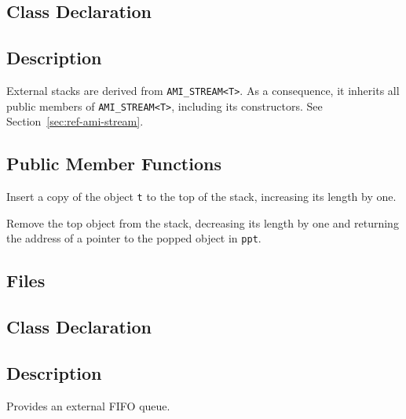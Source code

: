 \subsection{Class Declaration}
   \btabb
         {}
   \etabb

\subsection{Description}
External stacks are derived from  \lstinline|AMI_STREAM<T>|.
 As a
consequence, it inherits all public members of
\lstinline|AMI_STREAM<T>|, including its constructors. See
Section~\ref{sec:ref-ami-stream}.

\subsection{Public Member Functions}
   \btabb 
   
    {Insert a copy of the
     object \lstinline|t| to the top of the stack, increasing its
     length by one.}
   
    {Remove the top object from
     the stack, decreasing its length by one and returning the address
     of a pointer to the popped object in \lstinline|ppt|.}

   \etabb





\subsection{Files}
  \btabb
         {}
  \etabb

\subsection{Class Declaration}
   \btabb
         {}
   \etabb

\subsection{Description}
Provides an external FIFO queue. 

